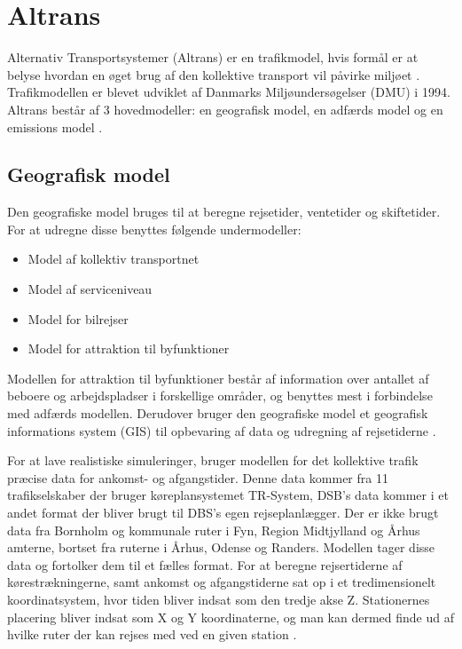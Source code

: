 \section{Altrans}
Alternativ Transportsystemer (Altrans) er en trafikmodel, hvis formål er at belyse hvordan en øget brug af den kollektive transport vil påvirke miljøet \cite[s. 14]{dmumodelanalyser}. Trafikmodellen er blevet udviklet af Danmarks Miljøundersøgelser (DMU) i 1994. Altrans består af 3 hovedmodeller: en geografisk model, en adfærds model og en emissions model \cite[s. 14]{dmuadfaerdsmodel}.
\subsection{Geografisk model}
Den geografiske model bruges til at beregne rejsetider, ventetider og skiftetider. For at udregne disse benyttes følgende undermodeller:

\begin{itemize}[H]
\item Model af kollektiv transportnet
\item Model af serviceniveau
\item Model for bilrejser
\item Model for attraktion til byfunktioner
\end{itemize}

Modellen for attraktion til byfunktioner består af information over antallet af beboere og arbejdspladser i forskellige områder, og benyttes mest i forbindelse med adfærds modellen. Derudover bruger den geografiske model et geografisk informations system (GIS) til opbevaring af data og udregning af rejsetiderne \cite[s. 18-19]{dmumodelanalyser}.

\vspace{5mm}

For at lave realistiske simuleringer, bruger modellen for det kollektive trafik præcise data for ankomst- og afgangstider. Denne data kommer fra 11 trafikselskaber der bruger køreplansystemet TR-System, DSB’s data kommer i et andet format der bliver brugt til DBS’s egen rejseplanlægger. Der er ikke brugt data fra Bornholm og kommunale ruter i Fyn, Region Midtjylland og Århus amterne, bortset fra ruterne i Århus, Odense og Randers. Modellen tager disse data og fortolker dem til et fælles format. For at beregne rejsertiderne af kørestrækningerne, samt ankomst og afgangstiderne sat op i et tredimensionelt koordinatsystem, hvor tiden bliver indsat som den tredje akse Z. Stationernes placering bliver indsat som X og Y koordinaterne, og man kan dermed finde ud af hvilke ruter der kan rejses med ved en given station \cite[s. 20-22]{dmumodelanalyser}.

